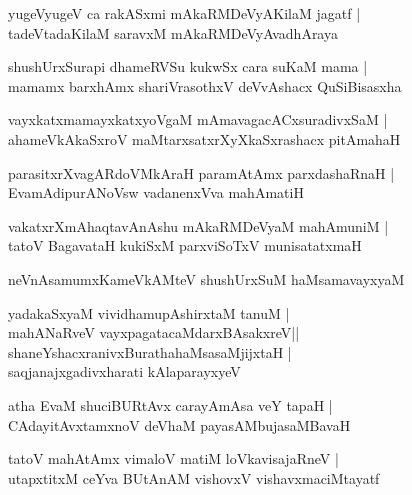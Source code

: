\begin{shloka}
yugeVyugeV ca rakASxmi mAkaRMDeVyAKilaM jagatf |\\
tadeVtadaKilaM saravxM mAkaRMDeVyAvadhAraya
\end{shloka}

\begin{shloka}
shushUrxSurapi dhameRVSu kukwSx cara suKaM mama |\\
mamamx barxhAmx shariVrasothxV deVvAshacx QuSiBisasxha 
\end{shloka}

\begin{shloka}
vayxkatxmamayxkatxyoVgaM mAmavagacACxsuradivxSaM |\\
ahameVkAkaSxroV maMtarxsatxrXyXkaSxrashacx pitAmahaH
\end{shloka}

\begin{shloka}
parasitxrXvagARdoVMkAraH paramAtAmx parxdashaRnaH |\\
EvamAdipurANoVsw vadanenxVva mahAmatiH 
\end{shloka}

\begin{shloka}
vakatxrXmAhaqtavAnAshu mAkaRMDeVyaM mahAmuniM |\\
tatoV BagavataH kukiSxM parxviSoTxV munisatatxmaH 
\end{shloka}

\begin{shloka}
neVnAsamumxKameVkAMteV shushUrxSuM haMsamavayxyaM 
\end{shloka}

\begin{shloka}
yadakaSxyaM vividhamupAshirxtaM tanuM |\\
mahANaRveV vayxpagatacaMdarxBAsakxreV||\\
shaneYshacxranivxBurathahaMsasaMjijxtaH |\\
saqjanajxgadivxharati kAlaparayxyeV 
\end{shloka}

\begin{shloka}
atha EvaM shuciBURtAvx carayAmAsa veY tapaH |\\
CAdayitAvxtamxnoV deVhaM payasAMbujasaMBavaH 
\end{shloka}

\begin{shloka}
tatoV mahAtAmx vimaloV matiM loVkavisajaRneV |\\
utapxtitxM ceYva BUtAnAM vishovxV vishavxmaciMtayatf
\end{shloka}

